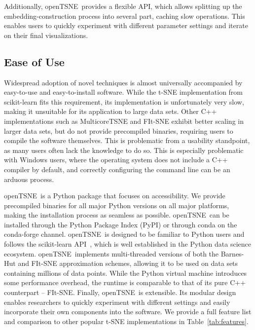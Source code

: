 \documentclass[twocolumn]{bmcart}
\newcommand{\opentsne}{\textsf{openTSNE}}
\begin{document}
Additionally, \opentsne\ provides a flexible API, which allows splitting up the
embedding-construction process into several part, caching slow operations. This
enables users to quickly experiment with different parameter settings and
iterate on their final visualizations.

\subsection*{Ease of Use}

Widespread adoption of novel techniques is almost universally accompanied by
easy-to-use and easy-to-install software. While the t-SNE implementation from
\textsf{scikit-learn} fits this requirement, its implementation is
unfortunately very slow, making it unsuitable for its application to large data
sets. Other C++ implementations such as \textsf{MulticoreTSNE} and
\textsf{FIt-SNE} exhibit better scaling in larger data sets, but do not provide
precompiled binaries, requiring users to compile the software themselves. This
is problematic from a usability standpoint, as many users often lack the
knowledge to do so. This is especially problematic with Windows users, where
the operating system does not include a C++ compiler by default, and correctly
configuring the command line can be an arduous process.

\opentsne\ is a Python package that focuses on accessibility. We provide
precompiled binaries for all major Python versions on all major platforms,
making the installation process as seamless as possible. \opentsne\ can be
installed through the Python Package Index (PyPI) or through conda on the
conda-forge channel. \opentsne\ is designed to be familiar to Python users and
follows the \textsf{scikit-learn} API~\cite{sklearn_api}, which is well
established in the Python data science ecosystem. \opentsne\ implements
multi-threaded versions of both the Barnes-Hut and FIt-SNE approximation
schemes, allowing it to be used on data sets containing millions of data
points. While the Python virtual machine introduces some performance overhead,
the runtime is comparable to that of its pure C++ counterpart --
\textsf{FIt-SNE}. Finally, \opentsne\ is extensible. Its modular design enables
researchers to quickly experiment with different settings and easily
incorporate their own components into the software. We provide a full feature
list and comparison to other popular t-SNE implementations in
Table~\ref{tab:features}.
\end{document}
